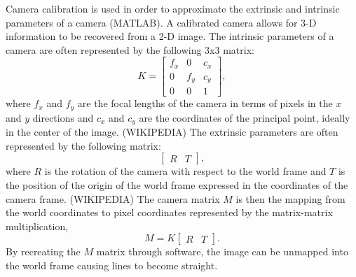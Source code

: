 \documentclass[arbeit=studie,oneside,BCOR=12mm]{ArbeitRST}
\begin{document}
Camera calibration is used in order to approximate the extrinsic and intrinsic
parameters of a camera (MATLAB). A calibrated camera allows for 3-D information
to be recovered from a 2-D image. The intrinsic parameters of a camera are
often represented by the following 3x3 matrix:
\begin{equation}
  K = 
  \begin{bmatrix} 
    f_x & 0 & c_x\\ 
    0 & f_y & c_y\\
    0 & 0 & 1 
  \end{bmatrix},
\end{equation}
where $f_x$ and $f_y$ are the focal lengths of the camera in terms of pixels in
the $x$ and $y$ directions and $c_x$ and $c_y$ are the coordinates of the
principal point, ideally in the center of the image. (WIKIPEDIA) The extrinsic
parameters are often represented by the following matrix: 
\begin{equation}
  \begin{bmatrix}
    R & T
  \end{bmatrix},
\end{equation}
where $R$ is the rotation of the camera with respect to the world frame and $T$
is the position of the origin of the world frame expressed in the coordinates
of the camera frame. (WIKIPEDIA) The camera matrix $M$ is then the mapping from
the world coordinates to pixel coordinates represented by the matrix-matrix 
multiplication,
\begin{equation}
  M = K 
  \begin{bmatrix}
    R & T
  \end{bmatrix}.
\end{equation}
By recreating the $M$ matrix through software, the image can be unmapped into
the world frame causing lines to become straight.
\end{document}
